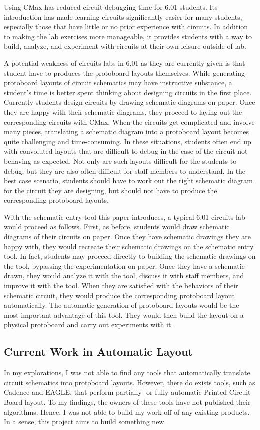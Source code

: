Using CMax has reduced circuit debugging time for 6.01 students.
Its introduction has made
learning circuits significantly easier for many students, especially those that
have little or no prior experience with circuits. In addition to making the lab
exercises more manageable, it provides students with a way to
build, analyze, and experiment with circuits at their own leisure outside of lab.

A potential weakness of circuits labs in 6.01 as they are currently given is
that student have to produces the protoboard layouts themselves.
While generating protoboard layouts
of circuit schematics may have instructive substance, a student's time is better
spent thinking about designing circuits in the first place.
Currently students design circuits by drawing schematic diagrams on paper.
Once they are happy with
their schematic diagrams, they proceed to laying out the corresponding circuits
with CMax. When the circuits get complicated and involve many pieces,
translating a
schematic diagram into a protoboard layout becomes quite challenging and
time-consuming. In these situations, students often end up with convoluted
layouts that are difficult to debug in the case of the
circuit not behaving as expected. Not only are such layouts difficult for the
students to debug, but they are also often difficult for staff
members to understand. In the best case scenario, students should have to work
out the right schematic diagram for the circuit they are designing,
but should not have
to produce the corresponding protoboard layouts.

With the schematic entry tool this paper introduces, a typical 6.01 circuits lab
would proceed as follows. First, as before, students would draw schematic
diagrams of their circuits on paper. Once they have
schematic drawings they are happy with, they would recreate their schematic
drawings on the schematic entry tool. In fact, students may proceed directly to
building the schematic drawings on the tool, bypassing the
experimentation on
paper. Once they have a schematic drawn, they would analyze it with the tool,
discuss it with staff members, and improve it with the tool. When they are
satisfied with the behaviors of their schematic circuit, they would produce the
corresponding protoboard layout automatically. The automatic generation of
protoboard layouts would be
the most important advantage of this tool. They would then build the layout on a
physical protoboard and carry out experiments with it.

\subsection{Current Work in Automatic Layout}
\label{sec:prev_layout}

In my explorations, I was not able to find any tools that
automatically translate circuit schematics into protoboard layouts.
However, there
do exists tools, such as Cadence\cite{cadence} and EAGLE\cite{eagle},
that perform partially- or fully-automatic Printed Circuit
Board layout. To my findings, the owners of these tools have not published
their algorithms. Hence, I was not able to build my
work off of any existing products. In a sense, this project aims to build
something new.
